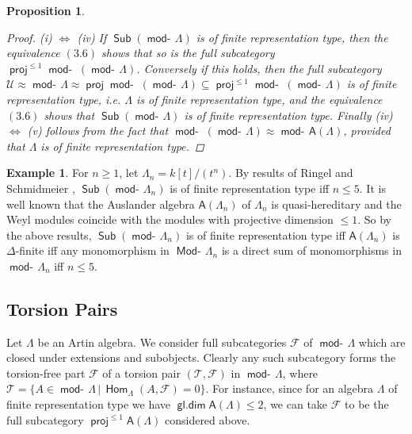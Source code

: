 \documentclass[oneside, a4paper,reqno]{amsart}
\numberwithin{equation}{section}
\newtheorem{prop}[thm]{Proposition}
\theoremstyle{definition}
\newtheorem{exam}[thm]{Example}
\begin{document}
\begin{prop}
\begin{proof}
(i) $\Leftrightarrow$ (iv) If $\operatorname*{\mathsf{Sub}}(\operatorname*{\mathsf{mod}-\!}\Lambda)$ is of finite representation type, then the equivalence $(3.6)$ shows that
so is the full subcategory $\operatorname*{\mathsf{proj}}^{\leq 1}\operatorname*{\mathsf{mod}-\!} \, (\operatorname*{\mathsf{mod}-\!}\Lambda)$. Conversely if this holds, then the full subcategory ${\mathcal U} \approx \operatorname*{\mathsf{mod}-\!}\Lambda \approx \operatorname*{\mathsf{proj}}\operatorname*{\mathsf{mod}-\!} \, (\operatorname*{\mathsf{mod}-\!}\Lambda) \subseteq \operatorname*{\mathsf{proj}}^{\leq 1}\operatorname*{\mathsf{mod}-\!} \, (\operatorname*{\mathsf{mod}-\!}\Lambda)$ is of finite representation type, i.e. $\Lambda$ is of finite representation type, and the equivalence $(3.6)$ shows that  $\operatorname*{\mathsf{Sub}}(\operatorname*{\mathsf{mod}-\!}\Lambda)$ is of finite representation type. Finally (iv) $\Leftrightarrow$ (v)  follows from the fact that $\operatorname*{\mathsf{mod}-\!} \, (\operatorname*{\mathsf{mod}-\!}\Lambda) \approx \operatorname*{\mathsf{mod}-\!}\mathsf{A}(\Lambda)$, provided that $\Lambda$ is of finite representation type.
\end{proof}
\end{prop}

\begin{exam} For $n \geq 1$, let $\Lambda_{n} = k[t]/(t^{n})$. By
results of Ringel and Schmidmeier \cite{RS2}, $\operatorname*{\mathsf{Sub}}(\operatorname*{\mathsf{mod}-\!}\Lambda_{n})$
is of finite representation type iff $n\leq 5$. It is well known
that the Auslander algebra $\mathsf{A}(\Lambda_{n})$ of
$\Lambda_{n}$ is quasi-hereditary and the Weyl modules coincide with
the modules with projective dimension $\leq 1$. So by the above
results, $\operatorname*{\mathsf{Sub}}(\operatorname*{\mathsf{mod}-\!}\Lambda_{n})$ is of finite representation type
iff $\mathsf{A}(\Lambda_{n})$ is $\Delta$-finite iff any
monomorphism in $\operatorname*{\mathsf{Mod}-\!}\Lambda_{n}$ is a direct sum of monomorphisms
in $\operatorname*{\mathsf{mod}-\!}\Lambda_{n}$ iff $n \leq 5$.
\end{exam}

\subsection{Torsion Pairs} Let $\Lambda$ be an Artin algebra.  We consider full
subcategories ${\mathcal F}$ of $\operatorname*{\mathsf{mod}-\!}\Lambda$ which are closed under
extensions and subobjects.  Clearly any such subcategory forms the
torsion-free part ${\mathcal F}$ of a torsion pair $({\mathcal T},{\mathcal F})$ in
$\operatorname*{\mathsf{mod}-\!}\Lambda$, where ${\mathcal T} = \{A \in \operatorname*{\mathsf{mod}-\!}\Lambda\, | \,
\operatorname{\mathsf{Hom}}_{\Lambda}(A,{\mathcal F}) = 0\}$. For instance, since for an algebra $\Lambda$ of finite representation type we have $\operatorname*{\mathsf{gl.dim}}\mathsf{A}(\Lambda) \leq 2$, we can take ${\mathcal F}$ to be the full subcategory $\operatorname*{\mathsf{proj}}^{\leq 1}\mathsf{A}(\Lambda)$ considered above.
\end{document}
